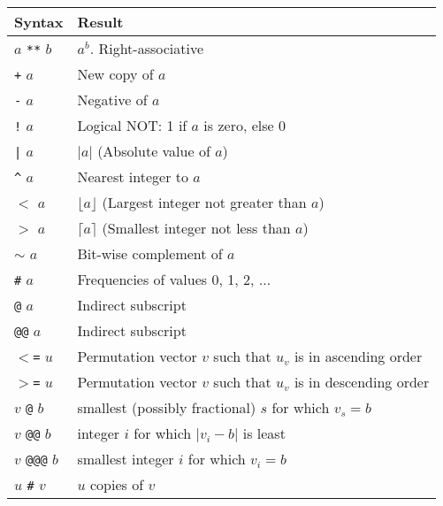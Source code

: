 \begin{tabular}{|l|l|}
    \hline 
      \textbf{Syntax} & 
      \textbf{Result}
    \\
    \hline 
        $a$
        \texttt{**}
        $b$
       & 
      $a^b$. Right-associative
    \\
    \hline
        \texttt{+}
        $a$
       & 
      New copy of 
      $a$
    \\
        \texttt{-}
        $a$
       & 
      Negative of 
      $a$
    \\
        \texttt{!}
        $a$
       & 
      Logical NOT: 1 if 
      $a$ is zero, else 0
    \\
        \texttt{|}
        $a$
       & 
      $|a|$ (Absolute value of $a$)
    \\
        \texttt{\^}
        $a$
       & 
      Nearest integer to $a$
    \\
        \texttt{$<$}
        $a$
       & 
      $\lfloor a \rfloor$ (Largest integer not greater than $a$)
    \\
        \texttt{$>$}
        $a$
       & 
      $\lceil a \rceil$ (Smallest integer not less than $a$)
    \\
        \texttt{$\sim$}
        $a$
       & 
      Bit-wise complement of 
      $a$
    \\
        \texttt{\#}
        $a$
       & 
      Frequencies of values 0, 1, 2, $\ldots$
    \\
        \texttt{@}
        $a$
       & 
      Indirect subscript
    \\
        \texttt{@@}
        $a$
       & 
      Indirect subscript
    \\
        \texttt{$<$=}
        $u$
       & 
      Permutation vector $v$ such that $u_v$ is in ascending order
    \\
        \texttt{$>$=}
        $u$
       & 
      Permutation vector $v$ such that $u_v$ is in descending order
    \\
    \hline
        $v$
        \texttt{@}
        $b$
       & 
      smallest (possibly fractional) $s$ for which $v_s=b$
    \\
        $v$ \texttt{@@} $b$
       & 
      integer $i$ for which $|v_i-b|$ is least
    \\
        $v$
        \texttt{@@@}
        $b$
       & 
      smallest integer $i$ for which $v_i=b$
    \\
    \hline
        $u$
        \texttt{\#}
        $v$
       & 
      $u$ copies of 
      $v$

\end{tabular}
